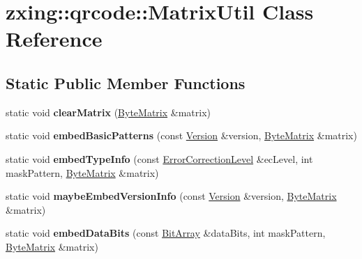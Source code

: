 \hypertarget{classzxing_1_1qrcode_1_1_matrix_util}{}\section{zxing\+:\+:qrcode\+:\+:Matrix\+Util Class Reference}
\label{classzxing_1_1qrcode_1_1_matrix_util}
\subsection*{Static Public Member Functions}
\begin{DoxyCompactItemize}
\item 
\mbox{\label{classzxing_1_1qrcode_1_1_matrix_util_a7b147459a21199b064a10b8bac9b05db}} 
static void {\bfseries clear\+Matrix} (\mbox{\hyperlink{classzxing_1_1qrcode_1_1_byte_matrix}{Byte\+Matrix}} \&matrix)
\item 
\mbox{\label{classzxing_1_1qrcode_1_1_matrix_util_a51abc07418f933058937ccb988a8d931}} 
static void {\bfseries embed\+Basic\+Patterns} (const \mbox{\hyperlink{classzxing_1_1qrcode_1_1_version}{Version}} \&version, \mbox{\hyperlink{classzxing_1_1qrcode_1_1_byte_matrix}{Byte\+Matrix}} \&matrix)
\item 
\mbox{\label{classzxing_1_1qrcode_1_1_matrix_util_a7e46380d51a4da69b141b4ef1b9b6716}} 
static void {\bfseries embed\+Type\+Info} (const \mbox{\hyperlink{classzxing_1_1qrcode_1_1_error_correction_level}{Error\+Correction\+Level}} \&ec\+Level, int mask\+Pattern, \mbox{\hyperlink{classzxing_1_1qrcode_1_1_byte_matrix}{Byte\+Matrix}} \&matrix)
\item 
\mbox{\label{classzxing_1_1qrcode_1_1_matrix_util_a6407e1f03b244dca9170c0cd7a050d32}} 
static void {\bfseries maybe\+Embed\+Version\+Info} (const \mbox{\hyperlink{classzxing_1_1qrcode_1_1_version}{Version}} \&version, \mbox{\hyperlink{classzxing_1_1qrcode_1_1_byte_matrix}{Byte\+Matrix}} \&matrix)
\item 
\mbox{\label{classzxing_1_1qrcode_1_1_matrix_util_a524fa5d6f68ed284449df85396cd33e1}} 
static void {\bfseries embed\+Data\+Bits} (const \mbox{\hyperlink{classzxing_1_1_bit_array}{Bit\+Array}} \&data\+Bits, int mask\+Pattern, \mbox{\hyperlink{classzxing_1_1qrcode_1_1_byte_matrix}{Byte\+Matrix}} \&matrix)

\end{DoxyCompactItemize}
